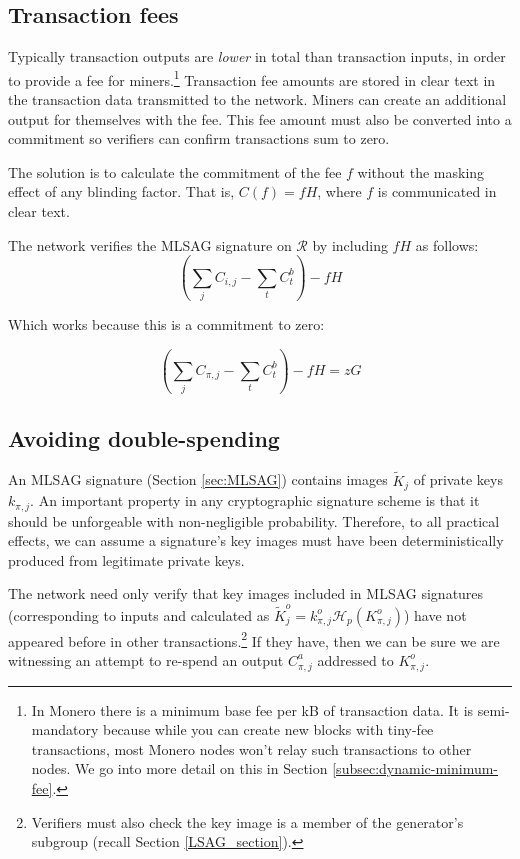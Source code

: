 \subsection{Transaction fees}

Typically transaction outputs are {\em lower} in total than transaction inputs, in order to provide a fee for miners.\footnote{In Monero there is a minimum base fee per kB of transaction data. It is semi-mandatory because while you can create new blocks with tiny-fee transactions, most Monero nodes won't relay such transactions to other nodes. We go into more detail on this in Section \ref{subsec:dynamic-minimum-fee}.} Transaction fee amounts are stored in clear text in the transaction data transmitted to the network. Miners can create an additional output for themselves with the fee. This fee amount must also be converted into a commitment so verifiers can confirm transactions sum to zero.

The solution is to calculate the commitment of the fee $f$ without the masking effect of any blinding factor. That is, $C(f) = f H$, where $f$ is communicated in clear text.

The network verifies the MLSAG signature on $\mathcal{R}$ by including $f H$ as follows:\\
\[ (\sum\limits_j C_{i, j} - \sum\limits_t C^b_{t}) - f H\]

Which works because this is a commitment to zero:

\[ (\sum\limits_j C_{\pi, j} - \sum\limits_t C^b_{t}) - f H = z G\]


\subsection{Avoiding double-spending}

An MLSAG signature (Section \ref{sec:MLSAG}) contains images \(\tilde{K}_{j}\) of private keys \(k_{\pi, j}\). An important property in any cryptographic signature scheme is that it should be unforgeable with non-negligible probability. Therefore, to all practical effects, we can assume a signature’s key images must have been deterministically produced from legitimate private keys.
	
The network need only verify that key images included in MLSAG signatures (corresponding to inputs and calculated as $\tilde{K}^o_{j} = k^o_{\pi,j} \mathcal{H}_p(K^o_{\pi,j})$) have not appeared before in other transactions.\footnote{Verifiers must also check the key image is a member of the generator's subgroup (recall Section \ref{LSAG_section}).} If they have, then we can be sure we are witnessing an attempt to re-spend an output $C^a_{\pi,j}$ addressed to $K_{\pi,j}^o$.

